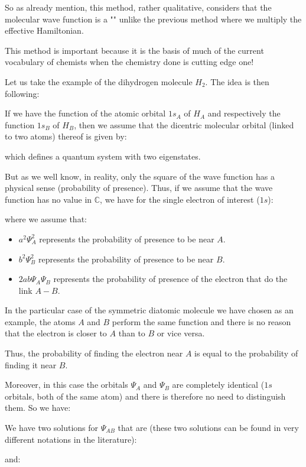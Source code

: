 	So as already mention, this method, rather qualitative, considers that the molecular wave function is a "" unlike the previous method where we multiply the effective Hamiltonian.
	
	This method is important because it is the basis of much of the current vocabulary of chemists when the chemistry done is cutting edge one!
	
	Let us take the example of the dihydrogen molecule $H_2$. The idea is then following:
	
	If we have the function of the atomic orbital $1s_A$ of $H_A$ and respectively the function $1s_B$ of $H_B$, then we assume that the dicentric molecular orbital (linked to two atoms) thereof is given by:
	
	which defines a quantum system with two eigenstates.

	But as we well know, in reality, only the square of the wave function has a physical sense (probability of presence). Thus, if we assume that the wave function has no value in $\mathbb{C}$, we have for the single electron of interest ($1s$):
	
	where we assume that:
	\begin{itemize}
		\item $a^2\Psi_A^2$ represents the probability of presence to be near $A$.
		\item $b^2\Psi_B^2$ represents the probability of presence to be near $B$.
		\item $2ab\Psi_A\Psi_B$ represents the probability of presence of the electron that do the link $A-B$.
	\end{itemize}
	In the particular case of the symmetric diatomic molecule we have chosen as an example, the atoms $A$ and $B$ perform the same function and there is no reason that the electron is closer to $A$ than to $B$ or vice versa.

	Thus, the probability of finding the electron near $A$ is equal to the probability of finding it near $B$.
	
	Moreover, in this case the orbitals $\Psi_A$ and $\Psi_B$ are completely identical ($1s$ orbitals, both of the same atom) and there is therefore no need to distinguish them. So we have:
	
	We have two solutions for $\Psi_{AB}$ that are (these two solutions can be found in very different notations in the literature):
	
	and:
	 
